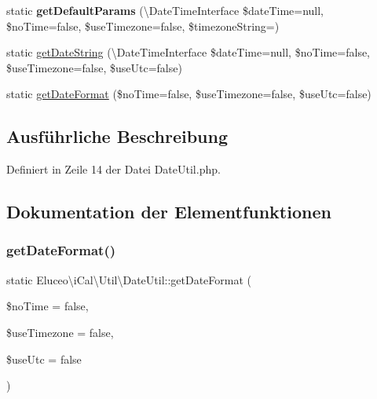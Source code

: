 \begin{DoxyCompactItemize}
\item 
\mbox{\label{class_eluceo_1_1i_cal_1_1_util_1_1_date_util_a25b13487df52f22514136a75dc2c5098}} 
static {\bfseries get\+Default\+Params} (\textbackslash{}Date\+Time\+Interface \$date\+Time=null, \$no\+Time=false, \$use\+Timezone=false, \$timezone\+String=\textquotesingle{}\textquotesingle{})
\item 
static \mbox{\hyperlink{class_eluceo_1_1i_cal_1_1_util_1_1_date_util_a999cb52e7d1d4ab1df3de5ab86c936c1}{get\+Date\+String}} (\textbackslash{}Date\+Time\+Interface \$date\+Time=null, \$no\+Time=false, \$use\+Timezone=false, \$use\+Utc=false)
\item 
static \mbox{\hyperlink{class_eluceo_1_1i_cal_1_1_util_1_1_date_util_ae98cad5c4edafa11ce5bc75ff0504ceb}{get\+Date\+Format}} (\$no\+Time=false, \$use\+Timezone=false, \$use\+Utc=false)
\end{DoxyCompactItemize}


\subsection{Ausführliche Beschreibung}


Definiert in Zeile 14 der Datei Date\+Util.\+php.



\subsection{Dokumentation der Elementfunktionen}
\mbox{\label{class_eluceo_1_1i_cal_1_1_util_1_1_date_util_ae98cad5c4edafa11ce5bc75ff0504ceb}} 
\subsubsection{\texorpdfstring{get\+Date\+Format()}{getDateFormat()}\hspace{0.1cm}{\footnotesize\ttfamily [1/3]}}
{\footnotesize\ttfamily static Eluceo\textbackslash{}i\+Cal\textbackslash{}\+Util\textbackslash{}\+Date\+Util\+::get\+Date\+Format (\begin{DoxyParamCaption}\item[{}]{\$no\+Time = {\ttfamily false},  }\item[{}]{\$use\+Timezone = {\ttfamily false},  }\item[{}]{\$use\+Utc = {\ttfamily false} }\end{DoxyParamCaption})\hspace{0.3cm}{\ttfamily [static]}}

